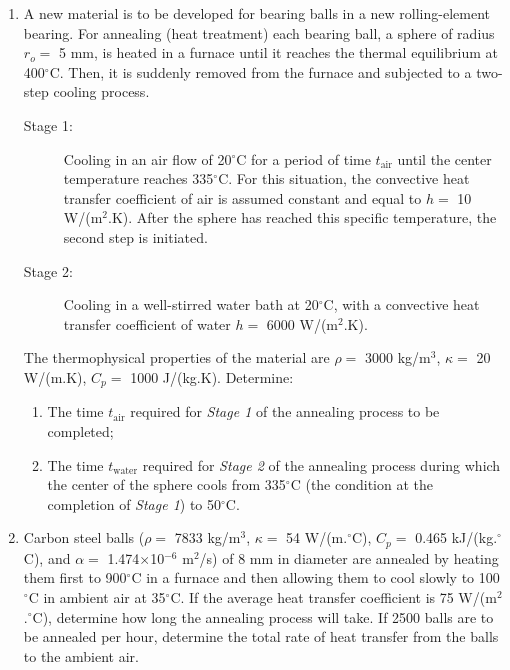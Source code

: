 \documentclass[12pts,a4paper,amsmath,amssymb,floatfix]{article}%
\begin{document}
\begin{enumerate}[label=\bfseries Problem \arabic*:]
\item\label{Problem:Analytical_Prob1} A new material is to be developed for bearing balls in a new rolling-element bearing. For annealing (heat treatment) each bearing ball, a sphere of radius $r_{o} =$ 5 mm, is heated in a furnace until it reaches the thermal equilibrium at 400$^{\circ}$C. Then, it is suddenly removed from the furnace and subjected to a two-step cooling process.
   \begin{description}
      \item[Stage 1:] Cooling in an air flow of 20$^{\circ}$C for a period of time $t_{\text{air}}$ until the center temperature reaches 335$^{\circ}$C. For this situation, the convective heat transfer coefficient of air is assumed constant and equal to $h =$ 10 W/(m$^{2}$.K). After the sphere has reached this specific temperature, the second step is initiated. 
      \item[Stage 2:] Cooling in a well-stirred water bath at 20$^{\circ}$C, with a convective heat transfer coefficient of water $h =$ 6000 W/(m$^{2}$.K). 
   \end{description}
   The thermophysical properties of the material are $\rho =$ 3000 kg/m$^{3}$, $\kappa =$ 20 W/(m.K), $C_{p} =$ 1000 J/(kg.K). Determine:
   \begin{enumerate}%
      \item The time $t_{\text{air}}$ required for {\it Stage 1} of the annealing process to be completed;
      \item The time $t_{\text{water}}$ required for {\it Stage 2} of the annealing process during which the center of the sphere cools from 335$^{\circ}$C (the condition at the completion of {\it Stage 1}) to 50$^{\circ}$C. 
   \end{enumerate}

\item\label{Problem:Lumped_Prob2} Carbon steel balls ($\rho=$ 7833 kg/m$^{3}$, $\kappa=$ 54 W/(m.$^{\circ}$C), $C_{p}=$ 0.465 kJ/(kg.$^{\circ}$C), and $\alpha=$ 1.474$\times$10$^{-6}$ m$^{2}$/s) of 8 mm in diameter are annealed by heating them first to 900$^{\circ}$C in a furnace and then allowing them to cool slowly to 100$^{\circ}$C in ambient air at 35$^{\circ}$C. If the average heat transfer coefficient is 75 W/(m$^{2}$.$^{\circ}$C), determine how long the annealing process will take. If 2500 balls are to be annealed per hour, determine the total rate of heat transfer from the balls to the ambient air.


\end{enumerate}
\end{document}
